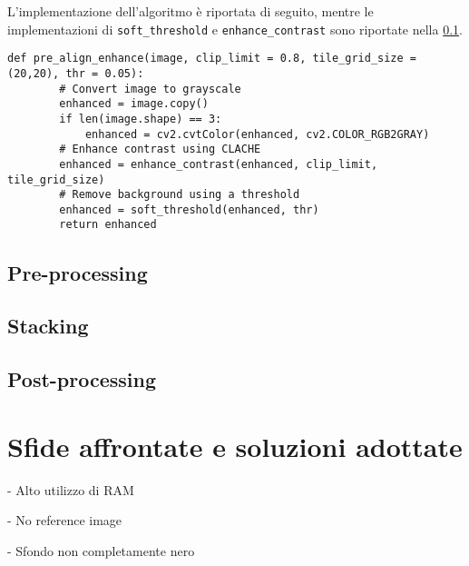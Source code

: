 L'implementazione dell'algoritmo è riportata di seguito, mentre le implementazioni di \texttt{soft\_threshold} e \texttt{enhance\_contrast}  sono riportate nella \cref{subsec:preprocessing_impl}.

\begin{lstlisting}[label={lst:pre_align_enhance}]
    def pre_align_enhance(image, clip_limit = 0.8, tile_grid_size = (20,20), thr = 0.05):
        # Convert image to grayscale
        enhanced = image.copy()
        if len(image.shape) == 3:
            enhanced = cv2.cvtColor(enhanced, cv2.COLOR_RGB2GRAY)
        # Enhance contrast using CLACHE
        enhanced = enhance_contrast(enhanced, clip_limit, tile_grid_size)
        # Remove background using a threshold
        enhanced = soft_threshold(enhanced, thr)
        return enhanced
\end{lstlisting}

\subsection{Pre-processing} \label{subsec:preprocessing_impl}

\subsection{Stacking} \label{subsec:stacking_impl}

\subsection{Post-processing} \label{subsec:postprocessing_impl}

\section{Sfide affrontate e soluzioni adottate} \label{sec:challenges}

- Alto utilizzo di RAM 

- No reference image

- Sfondo non completamente nero 



\cleardoublepage